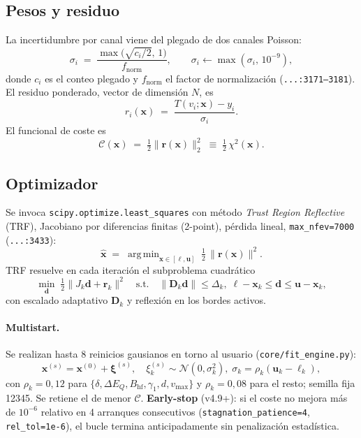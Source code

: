 \documentclass[11pt,a4paper]{article}
\newcommand{\BHF}{B_{\mathrm{hf}}}
\newcommand{\dEQ}{\Delta E_{Q}}
\newcommand{\code}[1]{\texttt{\small #1}}
\newcommand{\file}[1]{\textcolor{black!70}{\texttt{\small #1}}}
\DeclareMathOperator*{\argmin}{arg\,min}
\begin{document}
\subsection{Pesos y residuo}\label{sec:residuo}
La incertidumbre por canal viene del plegado de dos canales Poisson:
\begin{equation}
  \sigma_i \;=\; \frac{\max\!\bigl(\sqrt{c_i/2},\,1\bigr)}{f_{\text{norm}}},
  \qquad \sigma_i \leftarrow \max(\sigma_i,\,10^{-9}),
  \label{eq:sigma}
\end{equation}
donde $c_i$ es el conteo plegado y $f_{\text{norm}}$ el factor de normalización (\file{...:3171--3181}). El residuo ponderado, vector de dimensión $N$, es
\begin{equation}
  r_i(\bm x) \;=\; \frac{T(v_i;\bm x)-y_i}{\sigma_i}.
  \label{eq:residuo}
\end{equation}
El funcional de coste es
\begin{equation}
  \mathcal C(\bm x) \;=\; \tfrac12 \|\bm r(\bm x)\|_{2}^{2}
   \;\equiv\; \tfrac12\,\chi^{2}(\bm x).
  \label{eq:cost_disc}
\end{equation}

\subsection{Optimizador}\label{sec:opt}
Se invoca \code{scipy.optimize.least\_squares} con método \emph{Trust Region Reflective} (TRF), Jacobiano por diferencias finitas (2-point), pérdida lineal, \code{max\_nfev=7000} (\file{...:3433}):
\begin{equation}
  \hat{\bm x} \;=\; \argmin_{\bm x \in [\bm\ell,\bm u]}\; \tfrac12\,\|\bm r(\bm x)\|^{2}.
\end{equation}
TRF resuelve en cada iteración el subproblema cuadrático
\begin{equation}
  \min_{\bm d}\;\tfrac12\|J_k\bm d + \bm r_k\|^{2}
  \quad\text{s.t.}\quad \|\bm D_k \bm d\|\le \Delta_k,\; \bm\ell-\bm x_k\le\bm d\le\bm u-\bm x_k,
\end{equation}
con escalado adaptativo $\bm D_k$ y reflexión en los bordes activos.

\paragraph{Multistart.} Se realizan hasta 8 reinicios gausianos en torno al usuario (\file{core/fit\_engine.py}):
\begin{equation}
  \bm x^{(s)} = \bm x^{(0)} + \bm \xi^{(s)},\quad \xi^{(s)}_k \sim \mathcal N(0,\sigma_k^{2}),\;\sigma_k=\rho_k(\bm u_k-\bm\ell_k),
\end{equation}
con $\rho_k=0{,}12$ para $\{\delta,\dEQ,\BHF,\gamma_1,d,v_{\max}\}$ y $\rho_k=0{,}08$ para el resto; semilla fija 12345. Se retiene el de menor $\mathcal C$. \textbf{Early-stop} (v4.9+): si el coste no mejora más de $10^{-6}$ relativo en 4 arranques consecutivos (\code{stagnation\_patience=4}, \code{rel\_tol=1e-6}), el bucle termina anticipadamente sin penalización estadística.
\end{document}

